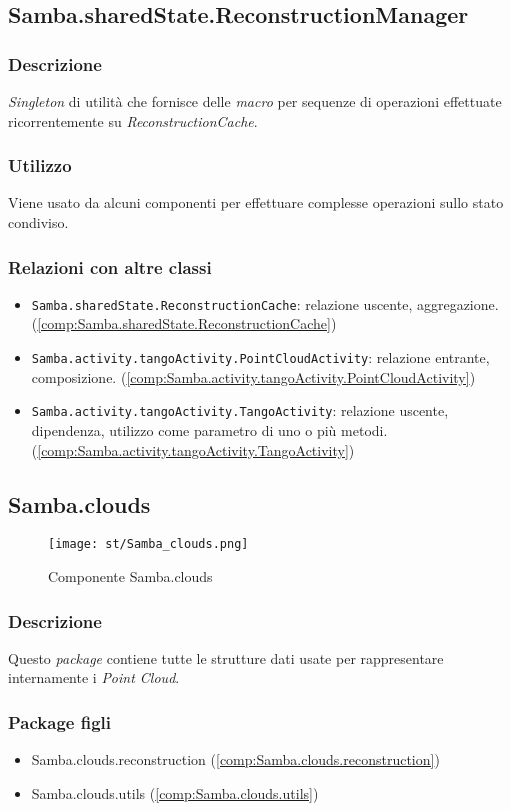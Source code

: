 \subsection{Samba.sharedState.ReconstructionManager}\label{comp:Samba.sharedState.ReconstructionManager}
\subsubsection{Descrizione}
\emph{Singleton} di utilità che fornisce delle \emph{macro} per sequenze di operazioni effettuate ricorrentemente su \emph{ReconstructionCache}.
\subsubsection{Utilizzo}
Viene usato da alcuni componenti per effettuare complesse operazioni sullo stato condiviso.
\subsubsection{Relazioni con altre classi}
\begin{itemize}
	\item \texttt{Samba.sharedState.ReconstructionCache}: relazione uscente, aggregazione. (\ref{comp:Samba.sharedState.ReconstructionCache})
	\item \texttt{Samba.activity.tangoActivity.PointCloudActivity}: relazione entrante, composizione. (\ref{comp:Samba.activity.tangoActivity.PointCloudActivity})
	\item \texttt{Samba.activity.tangoActivity.TangoActivity}: relazione uscente, dipendenza, utilizzo come parametro di uno o più metodi. (\ref{comp:Samba.activity.tangoActivity.TangoActivity})
\end{itemize}

\newpage
\subsection{Samba.clouds}\label{comp:Samba.clouds}
\begin{figure}[H] 
    \centering 
    \texttt{[image: st/Samba\_clouds.png]} 
    \caption{Componente Samba.clouds}
\end{figure}
\subsubsection{Descrizione}
Questo \emph{package} contiene tutte le strutture dati usate per rappresentare internamente i \emph{Point Cloud}.
\subsubsection{Package figli}
\begin{itemize}
	\item Samba.clouds.reconstruction (\ref{comp:Samba.clouds.reconstruction})
	\item Samba.clouds.utils (\ref{comp:Samba.clouds.utils})
\end{itemize}


